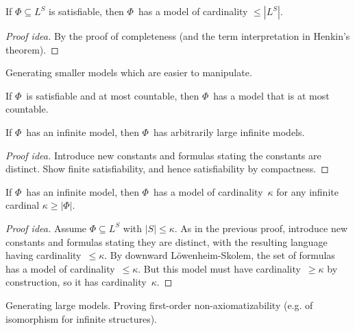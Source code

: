 \begin{thm}
If \(\Phi\subseteq L^S\) is satisfiable, then \(\Phi\)~has a model of cardinality \(\le|L^S|\).
\end{thm}
\begin{proof}[Proof idea]
By the proof of completeness (and the term interpretation in Henkin's theorem).
\end{proof}
\begin{app}
Generating smaller models which are easier to manipulate.
\end{app}
\begin{cor}
If \(\Phi\)~is satisfiable and at most countable, then \(\Phi\)~has a model that is at most countable.
\end{cor}

\begin{thm}
If \(\Phi\)~has an infinite model, then \(\Phi\)~has arbitrarily large infinite models.
\end{thm}
\begin{proof}[Proof idea]
Introduce new constants and formulas stating the constants are distinct. Show finite satisfiability, and hence satisfiability by compactness.
\end{proof}

\begin{thm}
If \(\Phi\)~has an infinite model, then \(\Phi\)~has a model of cardinality~\(\kappa\) for any infinite cardinal \(\kappa\ge|\Phi|\).
\end{thm}
\begin{proof}[Proof idea]
Assume \(\Phi\subseteq L^S\) with \(|S|\le\kappa\). As in the previous proof, introduce new constants and formulas stating they are distinct, with the resulting language having cardinality~\(\le\kappa\). By downward L\"owenheim-Skolem, the set of formulas has a model of cardinality~\(\le\kappa\). But this model must have cardinality~\(\ge\kappa\) by construction, so it has cardinality~\(\kappa\).
\end{proof}

\begin{app}
Generating large models. Proving first-order non-axiomatizability (e.g. of isomorphism for infinite structures).
\end{app}

